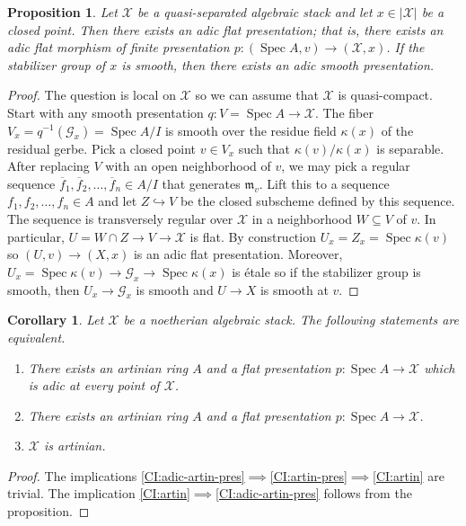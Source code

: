 \documentclass[a4paper]{amsart}
\theoremstyle{plain}
\newtheorem{corollary}[theorem]{Corollary}
\newtheorem{proposition}[theorem]{Proposition}
\theoremstyle{definition}
\theoremstyle{remark}
\numberwithin{equation}{section}
\newcommand{\inj}{\hookrightarrow} %
\newcommand{\stX}{\mathcal{X}} %
\newcommand{\stG}{\mathcal{G}} %
\newcommand{\idm}{\mathfrak{m}} %
\DeclareMathOperator{\Spec}{Spec}
\newcommand{\itemref}[1]{\eqref{#1}}
\begin{document}
\begin{proposition}
Let $\stX$ be a quasi-separated algebraic stack and let $x\in |\stX|$ be a
closed point. Then there exists an adic flat presentation; that is, there
exists an adic flat morphism of finite presentation $p\colon (\Spec A,v)\to
(\stX,x)$. If the stabilizer group of $x$ is smooth, then there exists an adic
smooth presentation.
\end{proposition}
\begin{proof}
The question is local on $\stX$ so we can assume that $\stX$ is quasi-compact.
Start with any smooth presentation $q\colon V=\Spec A\to \stX$. The fiber
$V_x=q^{-1}(\stG_x)=\Spec A/I$ is smooth over the residue field $\kappa(x)$ of
the residual gerbe. Pick a closed point $v\in V_x$ such that
$\kappa(v)/\kappa(x)$ is separable. After replacing $V$ with an open
neighborhood of $v$, we may pick a regular sequence
$\overline{f}_1,\overline{f}_2,\dots,\overline{f}_n\in A/I$ that generates
$\idm_v$. Lift this to a sequence $f_1,f_2,\dots,f_n\in A$ and let $Z\inj V$ be
the closed subscheme defined by this sequence. The sequence is transversely
regular over $\stX$ in a neighborhood $W\subseteq V$ of $v$. In particular,
$U=W\cap Z\to V\to \stX$ is flat. By construction $U_x=Z_x=\Spec \kappa(v)$ so
$(U,v)\to (X,x)$ is an adic flat presentation. Moreover, $U_x=\Spec \kappa(v)\to
\stG_x\to \Spec \kappa(x)$ is \'etale so if the stabilizer group is smooth, then
$U_x\to \stG_x$ is smooth and $U\to X$ is smooth at $v$.
\end{proof}

\begin{corollary}\label{C:adic-artin}
Let $\stX$ be a noetherian algebraic stack. The following statements
are equivalent.
\begin{enumerate}
\item\label{CI:adic-artin-pres}
  There exists an artinian ring $A$ and a flat presentation
$p\colon \Spec A\to \stX$ which is adic at every point of $\stX$.
\item\label{CI:artin-pres}
  There exists an artinian ring $A$ and a flat presentation
$p\colon \Spec A\to \stX$.
\item\label{CI:artin}
  $\stX$ is artinian.
\end{enumerate}
\end{corollary}
\begin{proof}
The implications
\itemref{CI:adic-artin-pres}$\implies$\itemref{CI:artin-pres}$\implies$\itemref{CI:artin}
are trivial. The implication
\itemref{CI:artin}$\implies$\itemref{CI:adic-artin-pres} follows from the
proposition.
\end{proof}
\end{document}
